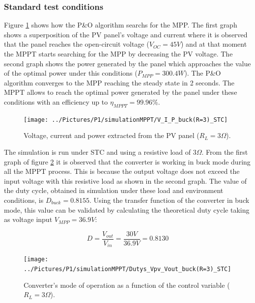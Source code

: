  \subsubsection*{Standard test conditions}
 
 Figure \ref{buckSTC} shows how the P\&O algorithm searchs for the MPP. The first graph shows a superposition of the PV panel's voltage and current where it is observed that the panel reaches the open-circuit voltage ($V_{OC}=45 V$) and at that moment the MPPT starts searching for the MPP by decreasing the PV voltage. The second graph shows the power generated by the panel which approaches the value of the optimal power under this conditions ($P_{MPP}=300.4 W$). The P\&O algorithm converges to the MPP reaching the steady state in 2 seconds. The MPPT allows to reach the optimal power generated by the panel under these conditions with an efficiency up to $\eta_{MPPT} = 99.96\% $.
\begin{figure}[H]
	\begin{center}
		\texttt{[image: ../Pictures/P1/simulationMPPT/V\_I\_P\_buck(R=3)\_STC]}
		\caption{Voltage, current and power extracted from the PV panel ($R_{L}=3\Omega$).}
		\label{buckSTC} 
	\end{center}	
\end{figure}

The simulation is run under STC and using a resistive load of $3\Omega$. From the first graph of figure \ref{buckSTC_duty} it is observed that the converter is working in buck mode during all the MPPT process. This is because the output voltage does not exceed the input voltage with this resistive load as shown in the second graph. The value of the duty cycle, obtained in simulation under these load and environment conditions, is $D_{buck}= 0.8155$. Using the transfer function of the converter in  buck mode, this value can be validated by calculating the theoretical duty cycle taking as voltage input $V_{MPP}=36.9 V$: 

\begin{equation}\label{buckmodeTF}
D = \frac{V_{out}}{V_{in}} = \frac{30V}{36.9V}= 0.8130 
\end{equation}



\begin{figure}[H]
	\begin{center}
		\texttt{[image: ../Pictures/P1/simulationMPPT/Dutys\_Vpv\_Vout\_buck(R=3)\_STC]}
		\caption{Converter's mode of operation as a function of the control variable ($R_{L}=3\Omega$).}
		\label{buckSTC_duty} 
	\end{center}	
\end{figure}

